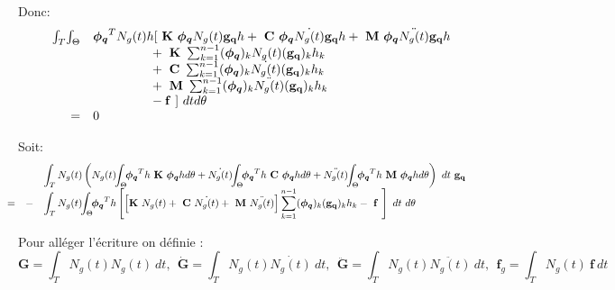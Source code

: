 \noindent
Donc:
\begin{equation}
\begin{array}{r r l}
	&\int_T \! \int_\Theta&		
		\boldsymbol{\phi_q}^TN_g(t)h [~\mathbf{K}~ \boldsymbol{\phi_q}N_g(t)\mathbf{g_q}h
						+ ~\mathbf{C}~ \boldsymbol{\phi_q} \dot{N_g(t)}\mathbf{g_q}h 
						+ ~\mathbf{M}~ \boldsymbol{\phi_q} \ddot{N_g(t)}\mathbf{g_q}h
	\\
	  	&&\phantom{\boldsymbol{\phi_q}N_g(t)h[
			}+~\mathbf{K}~ \sum_{k=1}^{n-1} (\boldsymbol{\phi_q})_k       N_g(t)(\mathbf{g_q})_k  h_k 
		\\ && \phantom{\boldsymbol{\phi_q}N_g(t)h[}
			+ ~\mathbf{C}~ \sum_{k=1}^{n-1} (\boldsymbol{\phi_q})_k  \dot{N_g(t)}(\mathbf{g_q})_k h_k 
		\\ && \phantom{\boldsymbol{\phi_q}N_g(t)h[}
			+ ~\mathbf{M}~ \sum_{k=1}^{n-1} (\boldsymbol{\phi_q})_k \ddot{N_g(t)}(\mathbf{g_q})_k h_k
		\\ && \phantom{\boldsymbol{\phi_q}N_g(t)h[}
		 -\mathbf{f}~ ] ~dt d\theta
	\\
	&= &0 
\end{array}
\end{equation}

\noindent
Soit:
\begin{equation}
\!\!\!\!\!\!\!\!\!\!
\begin{array}{r r l}
	&&\displaystyle \int_T N_g(t) \left( 
		 N_g(t) \!\!\int_\Theta\!\!		
			\boldsymbol{\phi_q}^Th ~\mathbf{K}~ \boldsymbol{\phi_q}h d\theta
	+ 
		\dot{N_g(t)} \!\!\int_\Theta\!\!		
			\boldsymbol{\phi_q}^Th ~\mathbf{C}~ \boldsymbol{\phi_q}h d\theta
	+ 
		\ddot{N_g(t)} \!\!\int_\Theta\!\!		
			\boldsymbol{\phi_q}^Th ~\mathbf{M}~ \boldsymbol{\phi_q}h d\theta
	  \right) ~dt ~\mathbf{g_q}
	\\
	= &-&
	\displaystyle
		\int_T N_g(t) \!\!\int_\Theta\!\!		
			\boldsymbol{\phi_q}^Th  \left[
				\left[
				   \mathbf{K}~ N_g(t)
				+ ~\mathbf{C}~ \dot{N_g(t)}
				+ ~\mathbf{M}~ \ddot{N_g(t)} \right] 
				\sum_{k=1}^{n-1} (\boldsymbol{\phi_q})_k (\mathbf{g_q})_k h_k
				- ~\mathbf{f}~ \right] ~dt ~d\theta
\end{array}
\end{equation}

Pour alléger l'écriture on définie :
\begin{equation}
\mathbf{G}        = \int_T \!\! N_g(t)       N_g(t)  ~dt, ~~ 
\mathbf{\dot{G}}  = \int_T \!\! N_g(t)  \dot{N_g(t)} ~dt, ~~ 
\mathbf{\ddot{G}} = \int_T \!\! N_g(t) \ddot{N_g(t)} ~dt, ~~
\mathbf{f}_g = \int_T N_g(t) ~\mathbf{f} ~dt 
\end{equation}

